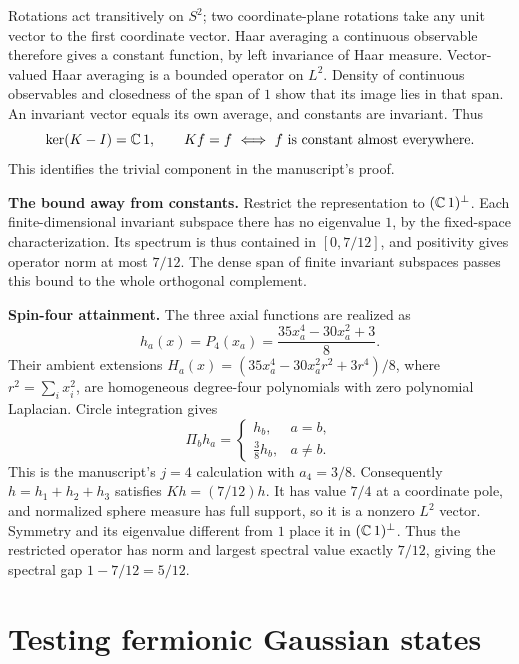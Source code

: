 \begin{theorem}
  Rotations act transitively on $S^2$; two coordinate-plane rotations take
  any unit vector to the first coordinate vector. Haar averaging a continuous
  observable therefore gives a constant function, by left invariance of
  Haar measure. Vector-valued Haar averaging is a bounded operator on $L^2$.
  Density of continuous observables and closedness of the span of $1$ show
  that its image lies in that span. An invariant vector equals its own
  average, and constants are invariant. Thus
  \[
    \ker(K-I)=\mathbb{C}\,1,
    \qquad Kf=f\ \Longleftrightarrow\ f\text{ is constant almost everywhere}.
  \]
  This identifies the trivial component in the manuscript's proof.

  \textbf{The bound away from constants.} Restrict the representation to
  $(\mathbb{C}\,1)^\perp$. Each finite-dimensional invariant subspace there has no
  eigenvalue $1$, by the fixed-space characterization. Its spectrum is thus
  contained in $[0,7/12]$, and positivity gives operator norm at most $7/12$.
  The dense span of finite invariant subspaces passes this bound to the whole
  orthogonal complement.

  \textbf{Spin-four attainment.} The three axial functions are realized as
  \[
    h_a(x)=P_4(x_a)=\frac{35x_a^4-30x_a^2+3}{8}.
  \]
  Their ambient extensions
  $H_a(x)=(35x_a^4-30x_a^2r^2+3r^4)/8$, where $r^2=\sum_i x_i^2$,
  are homogeneous degree-four polynomials with zero polynomial Laplacian.
  Circle integration gives
  \[
    \Pi_b h_a=\begin{cases}h_b,&a=b,\\ \tfrac38 h_b,&a\ne b.\end{cases}
  \]
  This is the manuscript's $j=4$ calculation with $a_4=3/8$.
  Consequently $h=h_1+h_2+h_3$ satisfies $Kh=(7/12)h$.
  It has value $7/4$ at a coordinate pole, and normalized sphere measure
  has full support, so it is a nonzero $L^2$ vector. Symmetry and its
  eigenvalue different from $1$ place it in $(\mathbb{C}\,1)^\perp$.
  Thus the restricted operator has norm and largest spectral value exactly
  $7/12$, giving the spectral gap $1-7/12=5/12$.
\end{theorem}

\chapter{Testing fermionic Gaussian states}\label{sec:fermions}

